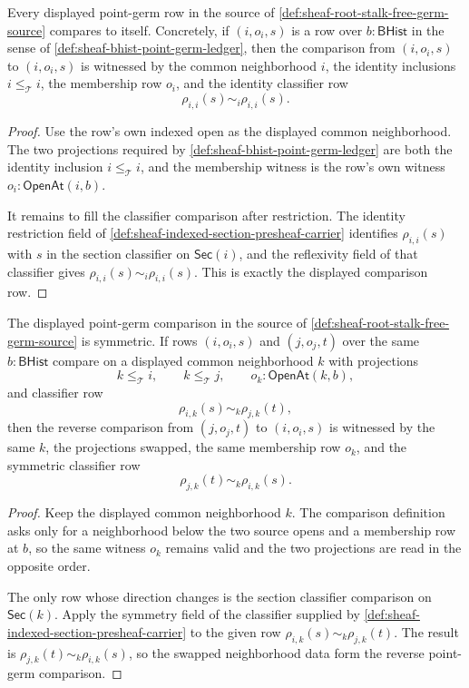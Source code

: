 \begin{theorem}
\label{thm:sheaf-root-point-germ-classifier-reflexive}
Every displayed point-germ row in the source of \autoref{def:sheaf-root-stalk-free-germ-source} compares to itself. Concretely, if $(i,o_i,s)$ is a row over $b:\mathsf{BHist}$ in the sense of \autoref{def:sheaf-bhist-point-germ-ledger}, then the comparison from $(i,o_i,s)$ to $(i,o_i,s)$ is witnessed by the common neighborhood $i$, the identity inclusions $i\le_{\mathcal{T}}i$, the membership row $o_i$, and the identity classifier row
$$
\rho_{i,i}(s)\sim_i\rho_{i,i}(s).
$$
\end{theorem}
\begin{proof}
Use the row's own indexed open as the displayed common neighborhood. The two projections required by \autoref{def:sheaf-bhist-point-germ-ledger} are both the identity inclusion $i\le_{\mathcal{T}}i$, and the membership witness is the row's own witness $o_i:\mathsf{OpenAt}(i,b)$.

It remains to fill the classifier comparison after restriction. The identity restriction field of \autoref{def:sheaf-indexed-section-presheaf-carrier} identifies $\rho_{i,i}(s)$ with $s$ in the section classifier on $\mathsf{Sec}(i)$, and the reflexivity field of that classifier gives $\rho_{i,i}(s)\sim_i\rho_{i,i}(s)$. This is exactly the displayed comparison row.
\end{proof}

\begin{theorem}
\label{thm:sheaf-root-point-germ-classifier-symmetric}
The displayed point-germ comparison in the source of \autoref{def:sheaf-root-stalk-free-germ-source} is symmetric. If rows $(i,o_i,s)$ and $(j,o_j,t)$ over the same $b:\mathsf{BHist}$ compare on a displayed common neighborhood $k$ with projections
$$
k\le_{\mathcal{T}}i,
\qquad
k\le_{\mathcal{T}}j,
\qquad
o_k:\mathsf{OpenAt}(k,b),
$$
and classifier row
$$
\rho_{i,k}(s)\sim_k\rho_{j,k}(t),
$$
then the reverse comparison from $(j,o_j,t)$ to $(i,o_i,s)$ is witnessed by the same $k$, the projections swapped, the same membership row $o_k$, and the symmetric classifier row
$$
\rho_{j,k}(t)\sim_k\rho_{i,k}(s).
$$
\end{theorem}
\begin{proof}
Keep the displayed common neighborhood $k$. The comparison definition asks only for a neighborhood below the two source opens and a membership row at $b$, so the same witness $o_k$ remains valid and the two projections are read in the opposite order.

The only row whose direction changes is the section classifier comparison on $\mathsf{Sec}(k)$. Apply the symmetry field of the classifier supplied by \autoref{def:sheaf-indexed-section-presheaf-carrier} to the given row $\rho_{i,k}(s)\sim_k\rho_{j,k}(t)$. The result is $\rho_{j,k}(t)\sim_k\rho_{i,k}(s)$, so the swapped neighborhood data form the reverse point-germ comparison.
\end{proof}

